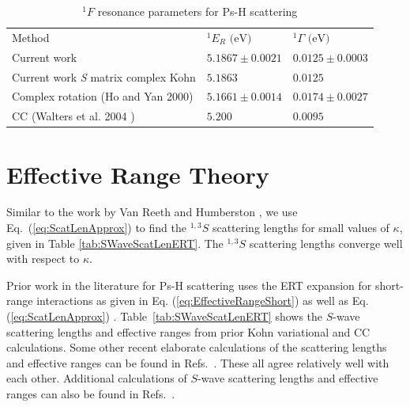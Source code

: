 \documentclass[preprint,showpacs,showkeys,preprintnumbers,amsmath,amssymb,longbibliography,pra,aps]{revtex4-1}
\begin{document}
\begin{table}[H]
\begin{center}
\begin{ruledtabular}
\begin{tabular}{l l l}
Method & $^1E_R \text{ (eV)}$ & $^1\Gamma \text{ (eV)}$ \\
\colrule
Current work & $5.1867 \pm 0.0021$ & $0.0125 \pm 0.0003$ \\
Current work \emph{S} matrix complex Kohn & $5.1863$ & $0.0125$ \\
Complex rotation (Ho and Yan 2000) \cite{Ho2000} & $5.1661 \pm 0.0014$ & $0.0174 \pm 0.0027$  \\
CC (Walters et al. 2004 \cite{Walters2004}) & $5.200$ & $0.0095$ \\
\end{tabular}
\end{ruledtabular}
\caption{$^1F$ resonance parameters for Ps-H scattering}
\label{tab:FWaveResonances}
\end{center}
\end{table}



\section{Effective Range Theory}

Similar to the work by Van Reeth and Humberston \cite{VanReeth2003}, we use 
Eq.~(\ref{eq:ScatLenApprox}) to find the $^{1,3}S$ scattering lengths for small 
values of $\kappa$, given in Table \ref{tab:SWaveScatLenERT}. The $^{1,3}S$
scattering lengths converge well with respect to $\kappa$.

Prior work in the literature for Ps-H scattering
\cite{Blackwood2002,Ivanov2002,Walters2004,VanReeth2003}
uses the ERT expansion for short-range 
interactions as given in Eq. (\ref{eq:EffectiveRangeShort})
as well as Eq. (\ref{eq:ScatLenApprox}) \cite{VanReeth2003}.
Table~\ref{tab:SWaveScatLenERT}
shows the $S$-wave scattering lengths and effective
ranges from prior Kohn variational \cite{VanReeth2003} and CC
\cite{Blackwood2002,Walters2004} calculations. Some other recent elaborate
calculations of the scattering lengths and effective ranges can be found in
Refs.~\cite{Sinha2000,Ivanov2001,Chiesa2002,Ivanov2002}.
These all agree relatively well with each 
other. Additional calculations of $S$-wave scattering lengths and effective 
ranges can also be found in
Refs.~\cite{Hara1975,Page1976,Drachman1975,
Drachman1976,Campbell1998,Adhikari1999,Adhikari2001b}.
\end{document}
